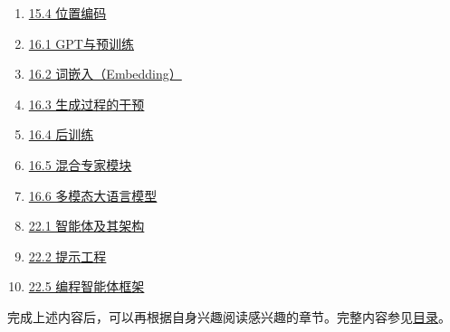 \begin{enumerate}
\item
  \href{docs/03-large-language-model/15-注意力机制与Transformer/15-04-位置编码.md}{15.4 位置编码}
\item
  \href{docs/03-large-language-model/16-大语言模型的基本原理/16-01-GPT与预训练.md}{16.1 GPT与预训练}
\item
  \href{docs/03-large-language-model/16-大语言模型的基本原理/16-02-词嵌入-Embedding.md}{16.2 词嵌入（Embedding）}
\item
  \href{docs/03-large-language-model/16-大语言模型的基本原理/16-03-生成过程的干预.md}{16.3 生成过程的干预}
\item
  \href{docs/03-large-language-model/16-大语言模型的基本原理/16-04-后训练.md}{16.4 后训练}
\item
  \href{docs/03-large-language-model/16-大语言模型的基本原理/16-05-混合专家模块.md}{16.5 混合专家模块}
\item
  \href{docs/03-large-language-model/16-大语言模型的基本原理/16-06-多模态大语言模型.md}{16.6 多模态大语言模型}
\item
  \href{docs/04-llm-agents/22-智能体/22-01-智能体及其架构.md}{22.1 智能体及其架构}
\item
  \href{docs/04-llm-agents/22-智能体/22-02-提示工程.md}{22.2 提示工程}
\item
  \href{docs/04-llm-agents/22-智能体/22-05-编程智能体框架.md}{22.5 编程智能体框架}
\end{enumerate}

完成上述内容后，可以再根据自身兴趣阅读感兴趣的章节。完整内容参见\href{目录.md}{目录}。

\clearpage
